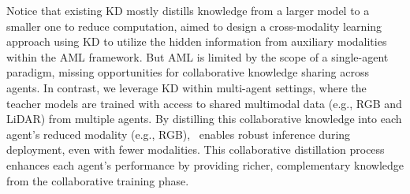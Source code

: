 Notice that existing KD mostly distills knowledge from a larger model to a smaller one to reduce computation, \citet{shen2023auxiliary} aimed to design a cross-modality learning approach using KD to utilize the hidden information from auxiliary modalities within the AML framework. But AML is limited by the scope of a single-agent paradigm, missing opportunities for collaborative knowledge sharing across agents. In contrast, we leverage KD within multi-agent settings, where the teacher models are trained with access to shared multimodal data (e.g., RGB and LiDAR) from multiple agents. By distilling this collaborative knowledge into each agent’s reduced modality (e.g., RGB), \ours~enables robust inference during deployment, even with fewer modalities. This collaborative distillation process enhances each agent’s performance by providing richer, complementary knowledge from the collaborative training phase.

\vspace{-5pt}